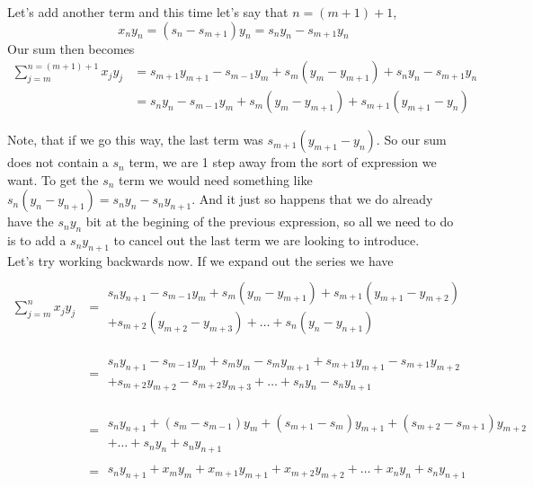 Let's add another term and this time let's say that $n = (m+1)+1$,
$$
x_n y_n = (s_n - s_{m+1}) y_n =
s_n y_n - s_{m+1} y_n
$$
Our sum then becomes
\begin{align*}
\sum^{n=(m+1)+1}_{j=m} x_j y_j &= s_{m+1} y_{m+1} - s_{m-1} y_m + s_m (y_m - y_{m+1}) + s_n y_n - s_{m+1} y_n \\
&= s_n y_n - s_{m-1} y_m + s_m (y_m - y_{m+1}) + s_{m+1} (y_{m+1} - y_n)
\end{align*}

Note, that if we go this way, the last term was $s_{m+1} (y_{m+1} - y_n)$.
So our sum does not contain a $s_n$ term, we are 1 step away from the sort of expression we want.
To get the $s_n$ term we would need something like $s_{n} (y_{n} - y_{n+1}) = s_{n}y_{n} - s_n y_{n+1}$.
And it just so happens that we do already have the $s_n y_n$ bit at the begining of the previous expression,
so all we need to do is to add a $s_n y_{n+1}$ to cancel out the last term we are looking to introduce.
\\

Let's try working backwards now.
If we expand out the series we have
\begin{align*}
\sum^{n}_{j=m} x_j y_j
&= \begin{split} \\
    s_n y_{n+1} - s_{m-1}y_m   + s_m(y_m -y_{m+1})    + s_{m+1}(y_{m+1} -y_{m+2})       \\ + s_{m+2}(y_{m+2} -y_{m+3})      + \ldots + s_n(y_n - y_{n+1}) \\
    \end{split} \\
&= \begin{split} \\
    s_n y_{n+1} - s_{m-1}y_m   + s_m y_m -s_m y_{m+1} + s_{m+1}y_{m+1} - s_{m+1}y_{m+2} \\ + s_{m+2}y_{m+2} -s_{m+2}y_{m+3} + \ldots + s_n y_n - s_n y_{n+1} \\
    \end{split} \\
&= \begin{split} \\
    s_n y_{n+1} + (s_m - s_{m-1})y_m + (s_{m+1} -s_m)y_{m+1} + (s_{m+2} -s_{m+1})y_{m+2} \\ + \ldots + s_n y_n + s_n y_{n+1}
    \end{split} \\
&= \begin{split}
    s_n y_{n+1} + x_m y_m + x_{m+1}y_{m+1} + x_{m+2}y_{m+2} + \ldots + x_n y_n + s_n y_{n+1}
    \end{split}
\end{align*}
\\~\\




